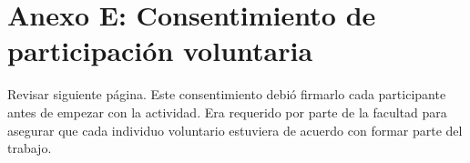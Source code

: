 \chapter*{Anexo E: Consentimiento de participación voluntaria}\label{AnexoE}

Revisar siguiente página. Este consentimiento debió firmarlo cada participante antes de empezar con la actividad. Era requerido por parte de la facultad para asegurar que cada individuo voluntario estuviera de acuerdo con formar parte del trabajo.


\begin{figure}[h]
   \centering
\end{figure}

\restoregeometry
